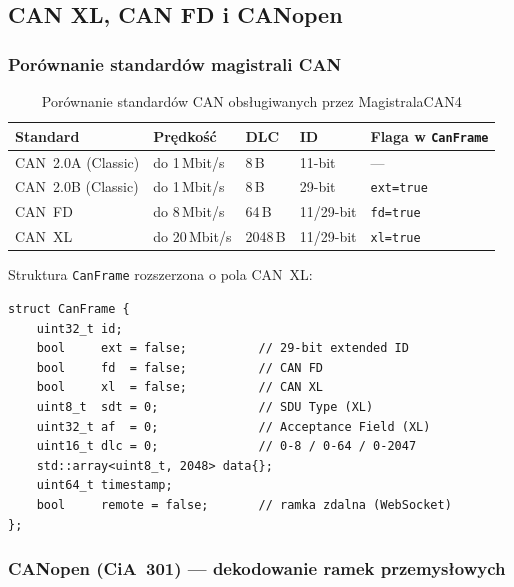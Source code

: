 \documentclass[12pt, a4paper]{article}
\begin{document}
\subsection{CAN XL, CAN FD i CANopen}

\subsubsection*{Porównanie standardów magistrali CAN}

\begin{table}[H]
\caption{Porównanie standardów CAN obsługiwanych przez MagistralaCAN4}
\label{tab:canstd}
\centering
\small
\begin{tabular}{p{3.0cm}p{2.3cm}p{2.2cm}p{2.0cm}p{4.5cm}}
\toprule
\textbf{Standard} & \textbf{Prędkość} & \textbf{DLC} & \textbf{ID} & \textbf{Flaga w \texttt{CanFrame}} \\
\midrule
CAN~2.0A (Classic) & do 1\,Mbit/s  & 8\,B  & 11-bit & ---  \\
CAN~2.0B (Classic) & do 1\,Mbit/s  & 8\,B  & 29-bit & \texttt{ext=true} \\
CAN~FD             & do 8\,Mbit/s  & 64\,B & 11/29-bit & \texttt{fd=true} \\
CAN~XL             & do 20\,Mbit/s & 2048\,B & 11/29-bit & \texttt{xl=true} \\
\bottomrule
\end{tabular}
\end{table}

Struktura \texttt{CanFrame} rozszerzona o pola CAN~XL:
\begin{lstlisting}[style=cpp, caption={Rozszerzona struktura CanFrame (CAN XL)}]
struct CanFrame {
    uint32_t id;
    bool     ext = false;          // 29-bit extended ID
    bool     fd  = false;          // CAN FD
    bool     xl  = false;          // CAN XL
    uint8_t  sdt = 0;              // SDU Type (XL)
    uint32_t af  = 0;              // Acceptance Field (XL)
    uint16_t dlc = 0;              // 0-8 / 0-64 / 0-2047
    std::array<uint8_t, 2048> data{};
    uint64_t timestamp;
    bool     remote = false;       // ramka zdalna (WebSocket)
};
\end{lstlisting}

\subsubsection*{CANopen (CiA~301) --- dekodowanie ramek przemysłowych}
\end{document}
